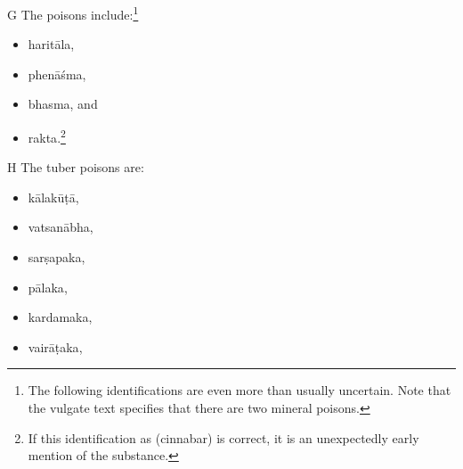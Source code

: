 \begin{translation}
\item[G] The   poisons
include:\footnote{The following identifications are even more
    than usually uncertain.  Note that the vulgate text specifies
    that there are two mineral poisons.}
              \begin{itemize}
\item \gls{haritāla},
\item \gls{phenāśma}, 
\item \gls{bhasma}, and
\item \gls{rakta}.\footnote{If this identification as  (cinnabar) is 
correct, it is an unexpectedly early mention of the substance.}        
            \end{itemize}


        \item[H]
        The tuber poisons are:
        \begin{itemize}
             \item \gls{kālakūṭā},

    \item \gls{vatsanābha},

    \item \gls{sarṣapaka},

    \item \gls{pālaka},
\item \gls{kardamaka},

\item \gls{vairāṭaka},
 

\end{itemize}
\end{translation}
